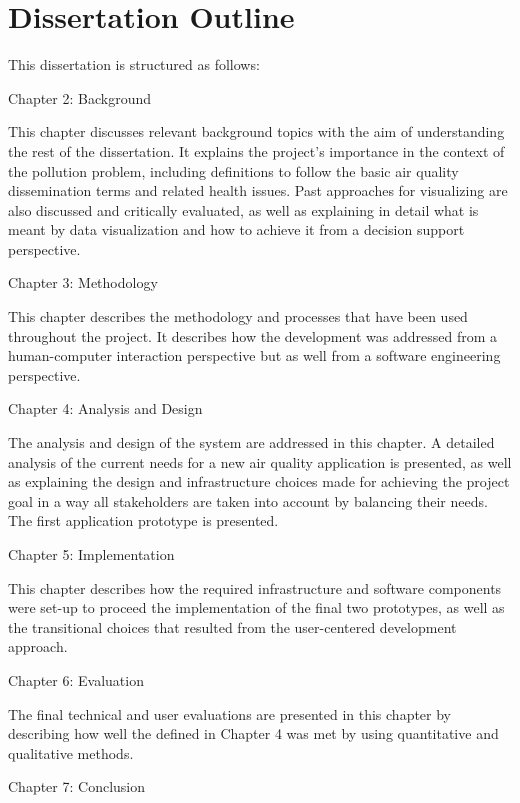\section{Dissertation Outline}
This dissertation is structured as follows: 
 
\bigskip
 Chapter 2: Background
\bigskip

This chapter discusses relevant background topics with the aim of understanding the rest of the dissertation. It explains the project's importance in the context of the pollution problem, including definitions to follow the basic air quality dissemination terms and related health issues. Past approaches for visualizing are also discussed and critically evaluated, as well as explaining in detail what is meant by data visualization and how to achieve it from a decision support perspective.
 
\bigskip
 Chapter 3: Methodology
\bigskip
  
This chapter describes the methodology and processes that have been used throughout the project. It describes how the development was addressed from a human-computer interaction perspective but as well from a software engineering perspective. 
  
\bigskip  
 Chapter 4: Analysis and Design
\bigskip

The analysis and design of the system are addressed in this chapter. A detailed analysis of the current needs for a new air quality application is presented, as well as explaining the design and infrastructure choices made for achieving the project goal in a way all stakeholders are taken into account by balancing their needs. The first application prototype is presented.
 
\bigskip
Chapter 5: Implementation
\bigskip

This chapter describes how the required infrastructure and software components were set-up to proceed the implementation of the final two prototypes, as well as the transitional choices that resulted from the user-centered development approach.

\bigskip
 Chapter 6: Evaluation
\bigskip

The final technical and user evaluations are presented in this chapter by describing how well the defined in Chapter 4 was met by using quantitative and qualitative methods.

\bigskip
 Chapter 7: Conclusion
\bigskip

